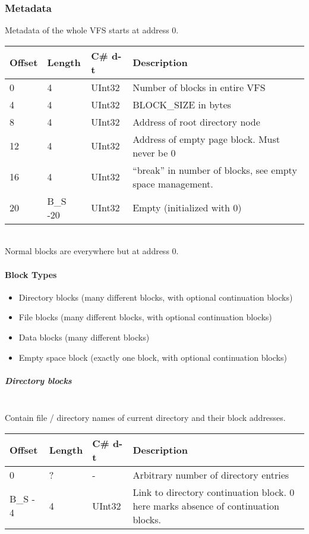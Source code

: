 \documentclass[a4paper,12pt]{article}
\begin{document}
\subsubsection{Metadata}

Metadata of the whole VFS starts at address 0.\\

\begin{tabular}{|p{1.5cm}|p{1.5cm}|p{1.5cm}|p{7cm}|}\hline
Offset 	&Length	&C\# d-t	&Description\\\hline
0	&4	&UInt32	&Number of blocks in entire VFS\\
4	&4	&UInt32	&BLOCK\_SIZE in bytes\\
8	&4	&UInt32	&Address of root directory node\\
12	&4	&UInt32	&Address of empty page block. Must never be 0\\
16	&4	&UInt32	&“break” in number of blocks, see empty space management.\\
20	&B\_S -20	&UInt32	&Empty (initialized with 0)\\\hline
\end{tabular}\\

Normal blocks are everywhere but at address 0.

\paragraph{Block Types}

\begin{itemize}
	\item Directory blocks (many different blocks, with optional continuation blocks)
	\item File blocks (many different blocks, with optional continuation blocks)
	\item Data blocks (many different blocks)
	\item Empty space block (exactly one block, with optional continuation blocks)
\end{itemize}

\subparagraph{Directory blocks} \mbox{} \\

Contain file / directory names of current directory and their block addresses.\\

\begin{tabular}{|p{1.5cm}|p{1.5cm}|p{1.5cm}|p{7cm}|}\hline
Offset 	&Length	&C\# d-t	&Description\\\hline
0	&?	&-	&Arbitrary number of directory entries\\
B\_S - 4	&4	&UInt32	&Link to directory continuation block. 0 here marks absence of continuation blocks.\\\hline
\end{tabular} \\
\end{document}
